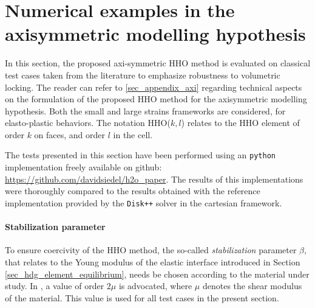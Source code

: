 

\section{Numerical examples in the axisymmetric modelling hypothesis}
\label{sec_numerical_examples}

In this section, the proposed axi-symmetric HHO method is evaluated on
classical test cases taken from the literature to emphasize robustness
to volumetric locking.
The reader can refer to \ref{sec_appendix_axi} regarding technical aspects on the formulation of the proposed HHO method for the axisymmetric modelling hypothesis. 
Both the small and large strains
frameworks are considered, for elasto-plastic behaviors. The notation
HHO($k,l$) relates to the HHO element of order $k$ on faces, and order $l$ in the
cell.

The tests presented in this section have been performed using an
\texttt{python} implementation freely available on github: \url{https://github.com/davidsiedel/h2o_paper}.
The results of this implementations were thoroughly compared to the
results obtained with the reference implementation provided by the
\texttt{Disk++} solver \cite{cicuttin_implementation_2018} in the cartesian framework.

\paragraph{Stabilization parameter}

To ensure coercivity of the HHO method, the so-called \textit{stabilization} parameter
$\beta$, that relates to the Young modulus of the elastic interface introduced in Section \ref{sec_hdg_element_equilibrium}, needs be chosen according to the material under study. In \cite{di_pietro_hybrid_2015}, a value of
order $2 \mu$ is advocated, where $\mu$ denotes the shear modulus of the
material. This value is used for all test cases in the present section.

